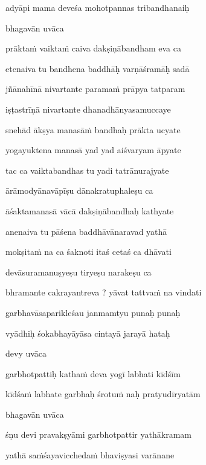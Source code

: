 adyāpi mama deveśa mohotpannas tribandhanaiḥ \veg\dontdisplaylinenum

bhagavān uvāca~{\dandab}\dontdisplaylinenum 

prāktaṁ vaiktaṁ caiva dakṣiṇābandham eva ca\thinspace{\danda} \dontdisplaylinenum

etenaiva tu bandhena baddhāḥ varṇāśramāḥ sadā \veg\dontdisplaylinenum

jñānahīnā nivartante paramaṁ prāpya tatparam\thinspace{\dandab} \dontdisplaylinenum

iṣṭastrīṇā nivartante dhanadhānyasamuccaye \danda\dontdisplaylinenum

snehād ākṣya manasāṁ bandhaḥ prākta ucyate \veg\dontdisplaylinenum

yogayuktena manasā yad yad aiśvaryam āpyate\thinspace{\dandab} \dontdisplaylinenum

tac ca vaiktabandhas tu yadi tatrānurajyate \veg\dontdisplaylinenum

ārāmodyānavāpīṣu dānakratuphaleṣu ca\thinspace{\dandab} \dontdisplaylinenum

āśaktamanasā vācā dakṣiṇābandhaḥ kathyate \veg\dontdisplaylinenum

anenaiva tu pāśena baddhāvānaravad yathā\thinspace{\dandab} \dontdisplaylinenum

mokṣitaṁ na ca śaknoti itaś cetaś ca dhāvati \veg\dontdisplaylinenum

devāsuramanuṣyeṣu tiryeṣu narakeṣu ca\thinspace{\dandab} \dontdisplaylinenum

bhramante cakrayantreva ? yāvat tattvaṁ na vindati \veg\dontdisplaylinenum

garbhavāsaparikleśau janmamtyu punaḥ punaḥ\thinspace{\dandab} \dontdisplaylinenum

vyādhiḥ śokabhayāyāsa cintayā jarayā hataḥ \veg\dontdisplaylinenum

devy uvāca~{\dandab}\dontdisplaylinenum 

garbhotpattiḥ kathaṁ deva yogī labhati kīdśīm\thinspace{\danda} \dontdisplaylinenum

kīdśaṁ labhate garbhaḥ śrotuṁ naḥ pratyudīryatām \veg\dontdisplaylinenum

bhagavān uvāca~{\dandab}\dontdisplaylinenum 

śṇu devi pravakṣyāmi garbhotpattir yathākramam\thinspace{\danda} \dontdisplaylinenum

yathā saṁśayavicchedaṁ bhaviṣyasi varānane \veg\dontdisplaylinenum

